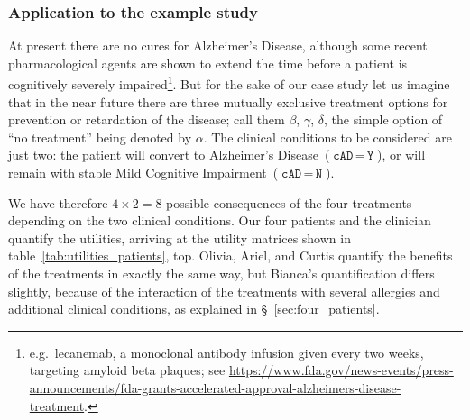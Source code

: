 \documentclass[utf8]{FrontiersinHarvard} %
\newcommand*{\mo}[1][=]{\mathord{\,#1\,}}
\newcommand*{\sect}{\S}%
\newcommand*{\eg}{{e.g.}}
\renewcommand*{\|}[1][]{\nonscript\:#1\vert\nonscript\:\mathopen{}}
\newcommand*{\cad}{\texttt{cAD}}
\newcommand*{\yes}{\texttt{Y}}
\newcommand*{\no}{\texttt{N}}
\newcommand*{\ad}{Alzheimer's Disease}
\newcommand*{\mci}{Mild Cognitive Impairment}
\begin{document}
\subsubsection{Application to the example study}
\label{sec:expected_utility_application}

At present there are no cures for \ad, although some recent pharmacological agents are shown to extend the time before a patient is cognitively severely impaired\footnote{\eg\ lecanemab, a monoclonal antibody infusion given every two weeks, targeting amyloid beta plaques; see \url{https://www.fda.gov/news-events/press-announcements/fda-grants-accelerated-approval-alzheimers-disease-treatment}.}. But for the sake of our case study let us imagine that in the near future there are three mutually exclusive treatment options for prevention or retardation of the disease; call them $\beta$, $\gamma$, $\delta$, the simple option of \enquote{no treatment} being denoted by $\alpha$. The clinical conditions to be considered are just two: the patient will convert to \ad\ ($\cad\mo\yes$), or will remain with stable \mci\ ($\cad\mo\no$).

We have therefore $4 \times 2 = 8$ possible consequences of the four treatments depending on the two clinical conditions. Our four patients and the clinician quantify the utilities, arriving at the utility matrices shown in table~\ref{tab:utilities_patients}, top. Olivia, Ariel, and Curtis quantify the benefits of the treatments in exactly the same way, but Bianca's quantification differs slightly, because of the interaction of the treatments with several allergies and additional clinical conditions, as explained in \sect~\ref{sec:four_patients}.
\end{document}
